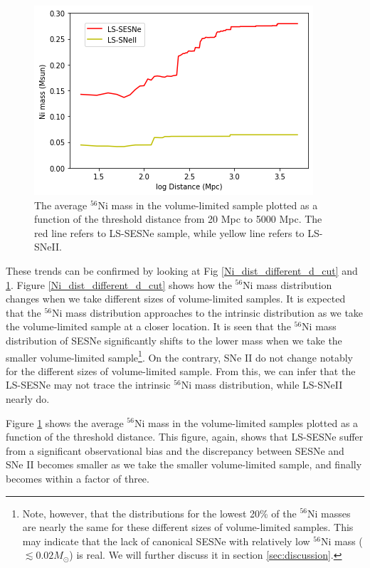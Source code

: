 \documentclass[twocolumn, linenumbers]{aastex62}
\begin{document}
\begin{figure}[htbp]
	\includegraphics[width=\columnwidth]{Ni_volume_limited.png}
    \caption{The average $^{56}$Ni mass in the volume-limited sample plotted as a function of the threshold distance from 20 Mpc to 5000 Mpc. The red line refers to LS-SESNe sample, while yellow line refers to LS-SNeII.}
     \label{Ni_volume_limited}
\end{figure}

These trends can be confirmed by looking at Fig \ref{Ni_dist_different_d_cut} and \ref{Ni_volume_limited}. Figure \ref{Ni_dist_different_d_cut} shows how the $^{56}$Ni mass distribution changes when we take different sizes of volume-limited samples. It is expected that the $^{56}$Ni mass distribution approaches to the intrinsic distribution as we take the volume-limited sample at a closer location. It is seen that the $^{56}$Ni mass distribution of SESNe significantly shifts to the lower mass when we take the smaller volume-limited sample\footnote{Note, however, that the distributions for the lowest 20\% of the $^{56}$Ni masses are nearly the same for these different sizes of volume-limited samples. This may indicate that 
the lack of canonical SESNe with relatively low $^{56}$Ni mass ($\lesssim 0.02M_{\odot}$) is real. We will further discuss it in section \ref{sec:discussion}.}.
On the contrary, SNe II do not change notably for the different sizes of volume-limited sample. From this, we can infer that the LS-SESNe may not trace the intrinsic $^{56}$Ni mass distribution, while LS-SNeII nearly do. 

Figure \ref{Ni_volume_limited} shows the average $^{56}$Ni mass in the volume-limited samples plotted as a function of the threshold distance.  This figure, again, shows that LS-SESNe suffer from a significant observational bias and the discrepancy between SESNe and SNe II becomes smaller as we take the smaller volume-limited sample, and finally becomes within a factor of three.
\end{document}

